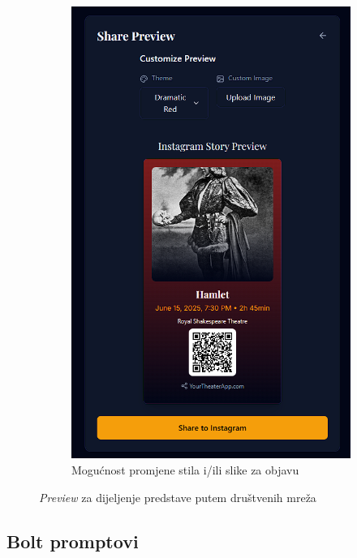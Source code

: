 \begin{itemize}
\begin{figure}[H]
\begin{subfigure}[b]{0.45\textwidth}
        \includegraphics[width=\linewidth]{Slike/FZ5/previewchanged.png}
        \caption{Mogućnost promjene stila i/ili slike za objavu}
        \label{fig:previewchange}
    \end{subfigure}
    \caption{\textit{Preview} za dijeljenje predstave putem društvenih mreža}
\end{figure}
\end{itemize}  


\subsection{Bolt promptovi}

